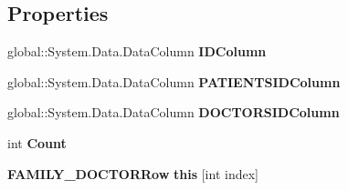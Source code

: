 \subsection*{Properties}
\begin{CompactItemize}
\item 
global::System.Data.DataColumn \textbf{IDColumn}\hspace{0.3cm}{\tt  [get]}\label{class_automatic_medical_system_1_1_data_set2_1_1_f_a_m_i_l_y___d_o_c_t_o_r_data_table_2120f0f6649c318398f25128203498f5}

\item 
global::System.Data.DataColumn \textbf{PATIENTSIDColumn}\hspace{0.3cm}{\tt  [get]}\label{class_automatic_medical_system_1_1_data_set2_1_1_f_a_m_i_l_y___d_o_c_t_o_r_data_table_b66d086537ae75dc48387feb4ad6429c}

\item 
global::System.Data.DataColumn \textbf{DOCTORSIDColumn}\hspace{0.3cm}{\tt  [get]}\label{class_automatic_medical_system_1_1_data_set2_1_1_f_a_m_i_l_y___d_o_c_t_o_r_data_table_6c93b325373b4d6c117887e348c723e3}

\item 
int \textbf{Count}\hspace{0.3cm}{\tt  [get]}\label{class_automatic_medical_system_1_1_data_set2_1_1_f_a_m_i_l_y___d_o_c_t_o_r_data_table_ca1fc232f22a737d3b58fa0d28272f28}

\item 
{\bf FAMILY\_\-DOCTORRow} \textbf{this} [int index]\hspace{0.3cm}{\tt  [get]}\label{class_automatic_medical_system_1_1_data_set2_1_1_f_a_m_i_l_y___d_o_c_t_o_r_data_table_e4bc50f459ed1d612a6257b003ed80d1}

\end{CompactItemize}

